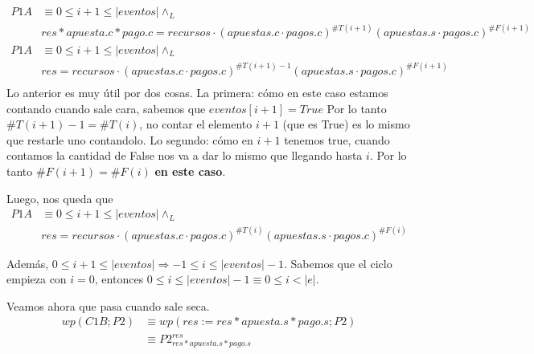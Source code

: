 \documentclass[../document.tex]{subfiles}
\begin{document}
\begin{equation} \label{eq2.a}
\begin{split}
P1A & \equiv 0\leq i+1 \leq |eventos| \land_L \\& res * apuesta.c * pago.c = recursos \cdot (apuestas.c\cdot pagos.c)^{\#T(i+1)}(apuestas.s\cdot pagos.c)^{\#F(i+1)}\\
P1A & \equiv 0\leq i+1 \leq |eventos| \land_L \\& res = recursos \cdot (apuestas.c\cdot pagos.c)^{\#T(i+1)-1}(apuestas.s\cdot pagos.c)^{\#F(i+1)}\\
\end{split}
\end{equation}
Lo anterior es muy útil por dos cosas.
La primera: cómo en este caso estamos contando cuando sale cara, sabemos que $eventos[i+1] = True$ Por lo tanto $\#T(i+1)-1=\#T(i)$, no contar el elemento $i+1$ (que es True) es lo mismo que restarle uno contandolo. Lo segundo: cómo en $i+1$ tenemos true, cuando contamos la cantidad de False nos va a dar lo mismo que llegando hasta $i$. Por lo tanto $\#F(i+1)=\#F(i)$ \textbf{en este caso}.

Luego, nos queda que
\begin{equation} 
    \begin{split}
    P1A & \equiv 0\leq i+1 \leq |eventos| \land_L \\& res = recursos \cdot (apuestas.c\cdot pagos.c)^{\#T(i)}(apuestas.s\cdot pagos.c)^{\#F(i)}
    \end{split}
\end{equation}

Además, $0\leq i+1 \leq |eventos| \Longrightarrow -1\leq i \leq |eventos|-1$. Sabemos que el ciclo empieza con $i=0$, entonces $0\leq i \leq |eventos|-1 \equiv 0\leq i < |e|$.

Veamos ahora que pasa cuando sale seca.
\begin{equation} \label{eq2.a}
\begin{split}
wp(C1B;P2) & \equiv wp(res := res * apuesta.s * pago.s; P2) \\
           & \equiv P2^{res}_{res * apuesta.s * pago.s} \\
\end{split}
\end{equation}
\end{document}
